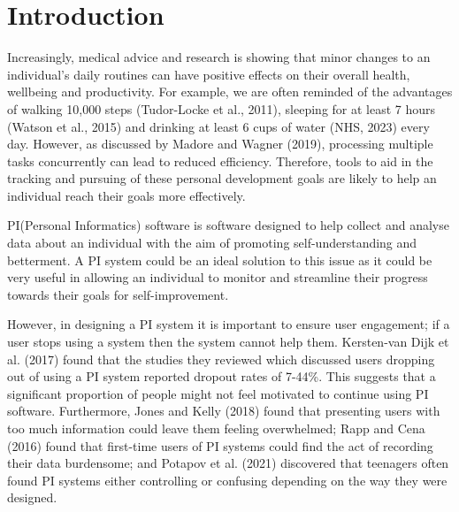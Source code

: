 \documentclass[12pt]{article}
\begin{document}
\section{Introduction}

Increasingly, medical advice and research is showing that minor changes to an
individual’s daily routines can have positive effects on their overall health,
wellbeing and productivity. For example, we are often reminded of the
advantages of walking 10,000 steps (Tudor-Locke et al., 2011), sleeping for at
least 7 hours (Watson et al., 2015) and drinking at least 6 cups of water (NHS,
2023) every day. However, as discussed by Madore and Wagner (2019), processing
multiple tasks concurrently can lead to reduced efficiency. Therefore, tools to
aid in the tracking and pursuing of these personal development goals are likely
to help an individual reach their goals more effectively.\par

PI(Personal Informatics) software is software designed to help collect and
analyse data about an individual with the aim of promoting self-understanding
and betterment. A PI system could be an ideal solution to this issue as it
could be very useful in allowing an individual to monitor and streamline their
progress towards their goals for self-improvement.\par

However, in designing a PI system it is important to ensure user engagement; if
a user stops using a system then the system cannot help them. Kersten-van Dijk
et al. (2017) found that the studies they reviewed which discussed users
dropping out of using a PI system reported dropout rates of 7-44\%. This
suggests that a significant proportion of people might not feel motivated to
continue using PI software. Furthermore, Jones and Kelly (2018) found that
presenting users with too much information could leave them feeling
overwhelmed; Rapp and Cena (2016) found that first-time users of PI systems
could find the act of recording their data burdensome; and Potapov et al.
(2021) discovered that teenagers often found PI systems either controlling or
confusing depending on the way they were designed.\par
\end{document}
